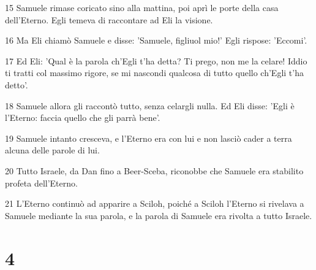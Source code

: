 \par 15 Samuele rimase coricato sino alla mattina, poi aprì le porte della casa dell'Eterno. Egli temeva di raccontare ad Eli la visione.
\par 16 Ma Eli chiamò Samuele e disse: 'Samuele, figliuol mio!' Egli rispose: 'Eccomi'.
\par 17 Ed Eli: 'Qual è la parola ch'Egli t'ha detta? Ti prego, non me la celare! Iddio ti tratti col massimo rigore, se mi nascondi qualcosa di tutto quello ch'Egli t'ha detto'.
\par 18 Samuele allora gli raccontò tutto, senza celargli nulla. Ed Eli disse: 'Egli è l'Eterno: faccia quello che gli parrà bene'.
\par 19 Samuele intanto cresceva, e l'Eterno era con lui e non lasciò cader a terra alcuna delle parole di lui.
\par 20 Tutto Israele, da Dan fino a Beer-Sceba, riconobbe che Samuele era stabilito profeta dell'Eterno.
\par 21 L'Eterno continuò ad apparire a Sciloh, poiché a Sciloh l'Eterno si rivelava a Samuele mediante la sua parola, e la parola di Samuele era rivolta a tutto Israele.

\chapter{4}

